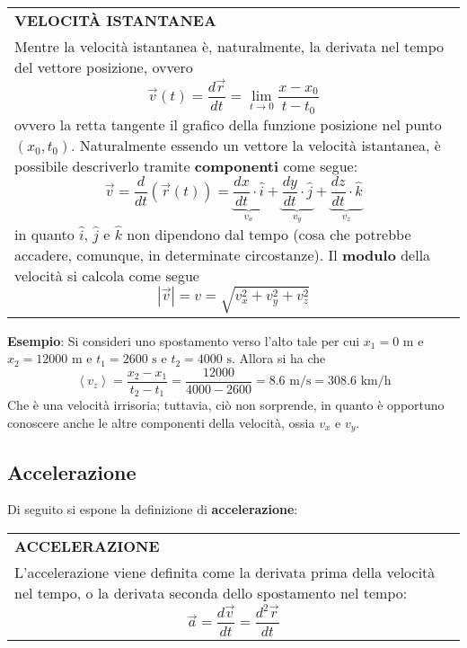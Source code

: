 \documentclass[a4paper]{extarticle}
\renewcommand\arraystretch{}
\begin{document}
\vspace{1em}
\setlength{\tabcolsep}{14pt}
\renewcommand{\arraystretch}{2}
\noindent
\begin{tabularx}{\textwidth}{@{}|P|@{}}
    \hline
    {\textbf{VELOCITÀ ISTANTANEA}}\\
    \parbox{\linewidth}{Mentre la velocità istantanea è, naturalmente, la derivata nel tempo del vettore posizione, ovvero
    \[\boxed{\vec{v}(t) = \frac{d\vec{r}}{dt} = \lim_{t \to 0} \frac{x - x_0}{t - t_0}}\]
    ovvero la retta tangente il grafico della funzione posizione nel punto $(x_0,t_0)$. Naturalmente essendo un vettore la velocità istantanea, è possibile descriverlo tramite \textbf{componenti} come segue:
    \[\vec{v} = \frac{d}{dt} \left(\vec{r}(t)\right) = \underbrace{\frac{dx}{dt} \cdot \hat{i}}_\text{$v_x$} + \underbrace{\frac{dy}{dt} \cdot \hat{j}}_\text{$v_y$} + \underbrace{\frac{dz}{dt} \cdot \hat{k}}_\text{$v_z$}\]
    in quanto $\hat{i}$, $\hat{j}$ e $\hat{k}$ non dipendono dal tempo (cosa che potrebbe accadere, comunque, in determinate circostanze).\\
    Il \textbf{modulo} della velocità si calcola come segue
    \[\left \vert \vec{v} \right \vert = v = \sqrt{v_x^2 + v_y^2 + v_z^2}\]
    \vspace{-1mm}}\\
    \hline
\end{tabularx}

\vspace{1em}
\noindent
\textbf{Esempio}: Si consideri uno spostamento verso l'alto tale per cui $x_1 = 0 \text{ m}$ e $x_2 = 12000 \text{ m}$ e $t_1 = 2600 \text{ s}$ e $t_2 = 4000 \text{ s}$. Allora si ha che
\[\left<v_z\right> = \frac{x_2 - x_1}{t_2 - t_1} = \frac{12000}{4000 - 2600} = 8.6 \text{ m/s} = 308.6 \text{ km/h}\]
Che è una velocità irrisoria; tuttavia, ciò non sorprende, in quanto è opportuno conoscere anche le altre componenti della velocità, ossia $v_x$ e $v_y$.

\vspace{1em}
\subsection{Accelerazione}
Di seguito si espone la definizione di \textbf{accelerazione}:

\vspace{1em}
\setlength{\tabcolsep}{14pt}
\renewcommand{\arraystretch}{2}
\noindent
\begin{tabularx}{\textwidth}{@{}|P|@{}}
    \hline
    {\textbf{ACCELERAZIONE}}\\
    \parbox{\linewidth}{L'accelerazione viene definita come la derivata prima della velocità nel tempo, o la derivata seconda dello spostamento nel tempo:
    \[\vec{a} = \frac{d \vec{v}}{dt} = \frac{d^2 \vec{r}}{dt}\]
    \vspace{-1mm}}\\
    \hline
\end{tabularx}
\end{document}
